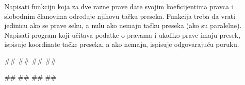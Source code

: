  
\begin{Exercise}[label=POK_03] 
Napisati funkciju  
koja za dve razne prave date svojim koeficijentima
pravca i slobodnim članovima određuje njihovu tačku preseka. 
Funkcija treba da vrati jedinicu ako se prave seku, a nulu ako nemaju
tačku preseka (ako su paralelne). Napisati program
koji učitava podatke o pravama i ukoliko prave imaju presek, ispisuje
koordinate tačke preseka, a ako nemaju, ispisuje odgovarajuću poruku.
   
\begin{miditest}
\begin{upotreba}{1}
#\naslovInt#
##
##
##
\end{upotreba}
\end{miditest}
\begin{miditest}
\begin{upotreba}{2}
#\naslovInt#
##
##
##
\end{upotreba}
\end{miditest}

\end{Exercise}
\ifresenja
\begin{Answer}[ref=POK_03]
\end{Answer}
 \fi

